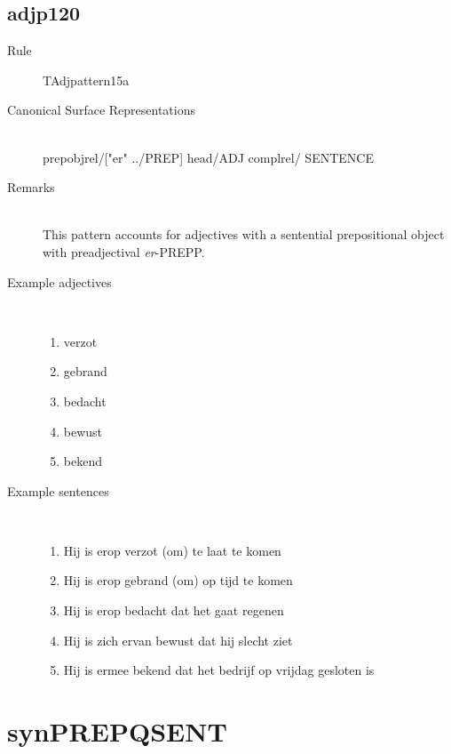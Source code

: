   \subsection{adjp120}
\begin{description}
  \item [Rule] TAdjpattern15a
  \item [Canonical Surface Representations] \mbox{}\\ prepobjrel/["er"  ../PREP] head/ADJ complrel/
SENTENCE
  \item [Remarks]  \mbox{}\\This pattern accounts for adjectives with a sentential 
prepositional object with preadjectival {\em er}-PREPP.

  \item [Example adjectives] \mbox{}\\
\begin{enumerate}
  \item verzot
  \item gebrand
  \item bedacht
  \item bewust
  \item bekend
\end{enumerate}
  \item [Example sentences]\mbox{}\\
\begin{enumerate}
  \item Hij is erop verzot (om) te laat te komen
  \item Hij is erop gebrand (om) op tijd te komen
  \item Hij is erop bedacht dat het gaat regenen 
  \item Hij is zich ervan bewust dat hij slecht ziet
  \item Hij is ermee bekend dat het bedrijf op vrijdag gesloten is 
\end{enumerate}
\end{description}
\newpage
\section{synPREPQSENT}
